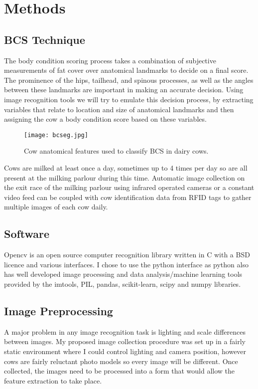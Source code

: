 \documentclass[11pt]{article}
\begin{document}
\newpage
\section{Methods}
	\subsection{BCS Technique}
		The body condition scoring process takes a combination of subjective measurements of fat cover over anatomical landmarks to decide on a final score.
		The prominence of the hips, tailhead, and spinous processes, as well as the angles between these landmarks are important in making an accurate decision.
		Using image recognition tools we will try to emulate this decision process, by extracting variables that relate to location and size of anatomical landmarks and then assigning the cow a body condition score based on these variables.

	\begin{figure}[h!]
		\centering
		\texttt{[image: bcseg.jpg]}
		\caption{Cow anatomical features used to classify BCS in dairy cows. \cite{Elanco}}
		\label{fig:<+label+>}
	\end{figure}

		Cows are milked at least once a day, sometimes up to 4 times per day so are all present at the milking parlour during this time.
		Automatic image collection on the exit race of the milking parlour using infrared operated cameras or a constant video feed can be coupled with cow identification data from RFID tags to gather multiple images of each cow daily.  

\subsection{Software}
	Opencv is an open source computer recognition library written in C with a BSD licence \cite{opencv_library} and various interfaces.
	I chose to use the python interface as python also has well developed image processing and data analysis/machine learning tools provided by the imtools, PIL, pandas, scikit-learn, scipy and numpy libraries.

	\newpage
\subsection{Image Preprocessing}
	A major problem in any image recognition task is lighting and scale differences between images.
	My proposed image collection procedure was set up in a fairly static environment where I could control lighting and camera position, however cows are fairly reluctant photo models so every image will be different.
	Once collected, the images need to be processed into a form that would allow the feature extraction to take place.
\end{document}

